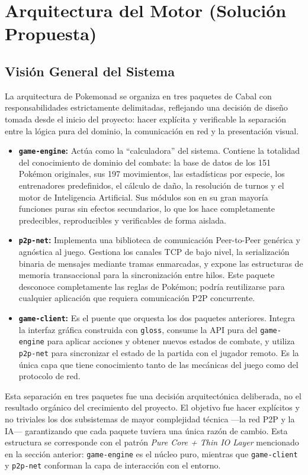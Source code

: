 \section{Arquitectura del Motor (Solución Propuesta)}

\subsection{Visión General del Sistema}

La arquitectura de Pokemonad se organiza en tres paquetes de Cabal \cite{cabal_guide} con responsabilidades estrictamente delimitadas, reflejando una decisión de diseño tomada desde el inicio del proyecto: hacer explícita y verificable la separación entre la lógica pura del dominio, la comunicación en red y la presentación visual.

\begin{itemize}
    \item \textbf{\texttt{game-engine}:} Actúa como la ``calculadora'' del sistema. Contiene la totalidad del conocimiento de dominio del combate: la base de datos de los 151 Pokémon originales, sus 197 movimientos, las estadísticas por especie, los entrenadores predefinidos, el cálculo de daño, la resolución de turnos y el motor de Inteligencia Artificial. Sus módulos son en su gran mayoría funciones puras sin efectos secundarios, lo que los hace completamente predecibles, reproducibles y verificables de forma aislada.
    \item \textbf{\texttt{p2p-net}:} Implementa una biblioteca de comunicación Peer-to-Peer genérica y agnóstica al juego. Gestiona los canales TCP de bajo nivel, la serialización binaria de mensajes mediante tramas enmarcadas, y expone las estructuras de memoria transaccional para la sincronización entre hilos. Este paquete desconoce completamente las reglas de Pokémon; podría reutilizarse para cualquier aplicación que requiera comunicación P2P concurrente.
    \item \textbf{\texttt{game-client}:} Es el puente que orquesta los dos paquetes anteriores. Integra la interfaz gráfica construida con \texttt{gloss}, consume la API pura del \texttt{game-engine} para aplicar acciones y obtener nuevos estados de combate, y utiliza \texttt{p2p-net} para sincronizar el estado de la partida con el jugador remoto. Es la única capa que tiene conocimiento tanto de las mecánicas del juego como del protocolo de red.
\end{itemize}

Esta separación en tres paquetes fue una decisión arquitectónica deliberada, no el resultado orgánico del crecimiento del proyecto. El objetivo fue hacer explícitos y no triviales los dos subsistemas de mayor complejidad técnica —la red P2P y la IA— garantizando que cada paquete tuviera una única razón de cambio. Esta estructura se corresponde con el patrón \textit{Pure Core + Thin IO Layer} mencionado en la sección anterior: \texttt{game-engine} es el núcleo puro, mientras que \texttt{game-client} y \texttt{p2p-net} conforman la capa de interacción con el entorno.

